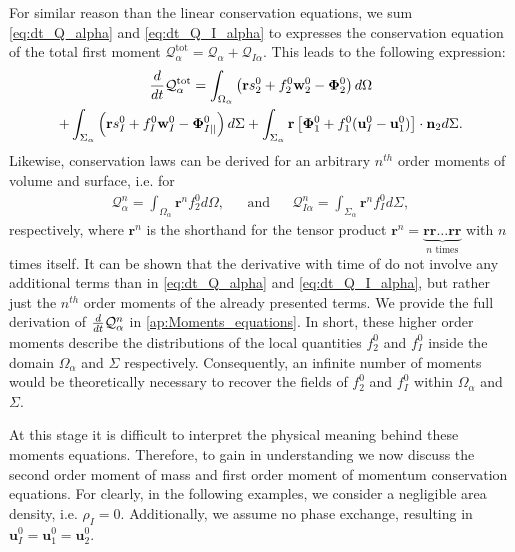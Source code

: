 For similar reason than the linear conservation equations, we sum \ref{eq:dt_Q_alpha} and \ref{eq:dt_Q_I_alpha} to expresses the conservation equation of the total first moment $\mathcal{Q}_\alpha^\text{tot} = \mathcal{Q}_\alpha + \mathcal{Q}_{I\alpha}$.
This leads to the following expression:
\begin{multline}
    \frac{d}{d t} \mathcal{Q}_\alpha^\text{tot}
    = \int_{\Omega_\alpha} \left(
        \textbf{r} s_2^0         
        + f_2^0  \textbf{w}_2^0 
        - \mathbf{\Phi}_2^0
    \right) d\Omega\\
    + \int_{\Sigma_\alpha} \left(
        \textbf{r}s_I^0
        + f_I^0 \textbf{w}_I^0
        - \mathbf{\Phi}_{I||}^0
    \right) d\Sigma
    + \int_{\Sigma_\alpha} \textbf{r} \left[
        \mathbf{\Phi}_1^0
        + f_1^0 (\textbf{u}_I^0-\textbf{u}_1^0)
    \right]\cdot \textbf{n}_2  d\Sigma.
    \label{eq:dt_Q_alpha_tot}
\end{multline}
Likewise, conservation laws can be derived for an arbitrary $n^{th}$ order moments of volume and surface, i.e. for
\begin{align}
    \mathcal{Q}_\alpha^n
    = \int_{\Omega_\alpha}
        \textbf{r}^n
        f_2^0 d\Omega,
        && \text{and} &&
    \mathcal{Q}_{I\alpha}^n
    = \int_{\Sigma_\alpha}
        \textbf{r}^n
    f_I^0 d\Sigma,
    \label{eq:Q_n_definition}
\end{align} 
respectively, where $\textbf{r}^n$ is the shorthand for the tensor product $\textbf{r}^n = \underbrace{\textbf{rr}\ldots \textbf{rr}}_{n\text{ times}} $ with $n$ times itself. 
It can be shown that the derivative with time of do not involve any additional terms than in \ref{eq:dt_Q_alpha} and \ref{eq:dt_Q_I_alpha}, but rather just the $n^{th}$ order moments of the already presented terms.
We provide the full derivation of $\frac{d}{d t} \mathcal{Q}_\alpha^n$ in \ref{ap:Moments_equations}.
In short, these higher order moments describe the distributions of the local quantities $f_2^0$ and $f_I^0$ inside the domain $\Omega_\alpha$ and $\Sigma$ respectively.
Consequently, an infinite number of moments would be theoretically necessary to recover the fields of $f_2^0$ and $f_I^0$  within $\Omega_\alpha$ and $\Sigma$. 


At this stage it is difficult to interpret the physical meaning behind these moments equations. 
Therefore, to gain in understanding we now discuss the second order moment of mass and first order moment of momentum conservation equations. 
For clearly, in the following examples, we consider a negligible area density, i.e. $\rho_I=0$. 
Additionally, we assume no phase exchange, resulting in $\textbf{u}_I^0=\textbf{u}_1^0=\textbf{u}_2^0$. 

